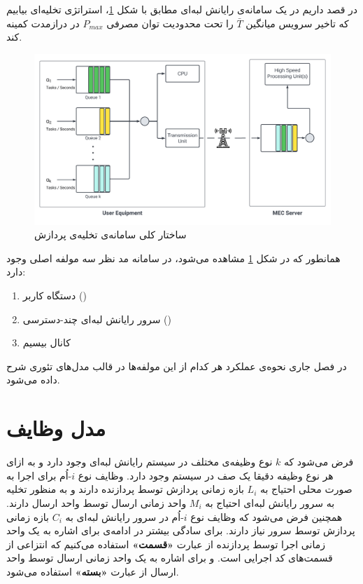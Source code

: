 در \CurrentProject قصد داریم در یک سامانه‌ی رایانش لبه‌ای مطابق با شکل \ref{fig-offloading-system}، استراتژی تخلیه‌ای بیابیم که تاخیر سرویس میانگین $\bar{T}$ را تحت محدودیت توان مصرفی $P_{m a x}$ در درازمدت کمینه کند.
\begin{figure}[H]
	\centering
	\includegraphics*[width=\textwidth]{figures/MEC5.png}
	\caption{ساختار کلی سامانه‌ی تخلیه‌ی پردازش}
	\label{fig-offloading-system}
\end{figure}
\newpage
همانطور که در شکل \ref{fig-offloading-system} مشاهده می‌شود، در سامانه مد نظر سه مولفه اصلی وجود دارد:
\begin{enumerate}
	\item دستگاه کاربر ()
	\item سرور رایانش لبه‌ای چند-دسترسی ()
	\item کانال بیسیم
\end{enumerate}
در فصل جاری نحوه‌ی عملکرد هر کدام از این مولفه‌ها در قالب مدل‌های تئوری شرح داده می‌شود.

\section{مدل وظایف}
فرض می‌شود که \(k\) نوع وظیفه‌ی مختلف در سیستم رایانش لبه‌ای وجود دارد و به ازای هر نوع وظیفه دقیقا یک صف در سیستم وجود دارد. وظایف نوع \(i\)-اُم برای اجرا به صورت محلی احتیاج به \(L_i\) بازه زمانی پردازش توسط پردازنده دارند و به منظور تخلیه به سرور رایانش لبه‌ای احتیاج به \(M_i\) واحد زمانی ارسال توسط واحد ارسال دارند. همچنین فرض می‌شود که وظایف نوع \(i\)-اُم در سرور رایانش لبه‌ای به \(C_i\) بازه زمانی پردازش توسط سرور نیاز دارند. برای سادگی بیشتر در ادامه‌ی \CurrentProject برای اشاره به یک واحد زمانی اجرا توسط پردازنده از عبارت \textbf{«قسمت»} استفاده می‌کنیم که انتزاعی از قسمت‌های کد اجرایی است. و برای اشاره به یک واحد زمانی ارسال توسط واحد ارسال از عبارت\textbf{ «بسته» }استفاده می‌شود.
\newpage

